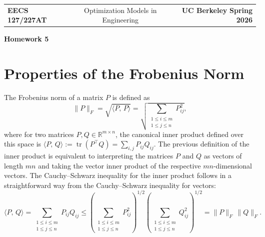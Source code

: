 \documentclass[10pt]{article}
\theoremstyle{definition}
\theoremstyle{plain}
\newcommand{\RR}{\mathbb{R}}
\DeclareMathOperator{\trace}{tr}
\begin{document}
\begin{center}
\begin{tabular}{lcr}
\textbf{EECS 127/227AT} & Optimization Models in Engineering & \textbf{UC Berkeley} \quad \textbf{Spring 2026}
\end{tabular}

\medskip
{\Large \textbf{Homework 5}}
\end{center}

\section{Properties of the Frobenius Norm}

The Frobenius norm of a matrix $P$ is defined as
\begin{equation}
\|P\|_F = \sqrt{\langle P,\, P \rangle} = \sqrt{\sum_{\substack{1 \le i \le m \\ 1 \le j \le n}} P_{ij}^2},
\end{equation}
where for two matrices $P, Q \in \RR^{m \times n}$, the canonical inner product defined over this space is $\langle P,\, Q \rangle := \trace\!\left(P^\top Q\right) = \sum_{i,j} P_{ij} Q_{ij}$. The previous definition of the inner product is equivalent to interpreting the matrices $P$ and $Q$ as vectors of length $mn$ and taking the vector inner product of the respective $mn$-dimensional vectors. The Cauchy--Schwarz inequality for the inner product follows in a straightforward way from the Cauchy--Schwarz inequality for vectors:
\begin{equation}
\langle P,\, Q \rangle = \sum_{\substack{1 \le i \le m \\ 1 \le j \le n}} P_{ij} Q_{ij}
\le \left(\sum_{\substack{1 \le i \le m \\ 1 \le j \le n}} P_{ij}^2\right)^{1/2}
\left(\sum_{\substack{1 \le i \le m \\ 1 \le j \le n}} Q_{ij}^2\right)^{1/2}
= \|P\|_F \, \|Q\|_F.
\end{equation}
\end{document}
